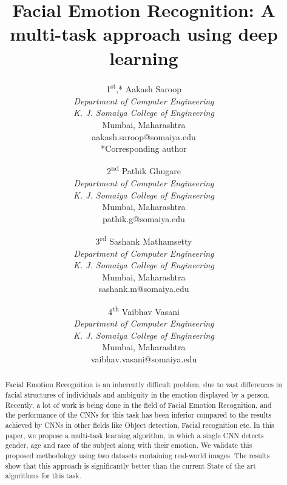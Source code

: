 \documentclass[letterpaper,10pt]{article}
\begin{document}
\title{Facial Emotion Recognition: A multi-task approach using deep learning}

\author{{1\textsuperscript{st},* Aakash Saroop}\\
{\textit{Department of Computer Engineering}} \\
{\textit{K. J. Somaiya College of Engineering}}\\
{Mumbai, Maharashtra}\\
{aakash.saroop@somaiya.edu}\\
{*Corresponding author}\\
\and
{2\textsuperscript{nd} Pathik Ghugare}\\
{\textit{Department of Computer Engineering}}\\
{\textit{K. J. Somaiya College of Engineering}}\\
{Mumbai, Maharashtra} \\
{pathik.g@somaiya.edu}\\
\and
{3\textsuperscript{rd} Sashank Mathamsetty}\\
{\textit{Department of Computer Engineering}}\\
{\textit{K. J. Somaiya College of Engineering}}\\
{Mumbai, Maharashtra} \\
{sashank.m@somaiya.edu }\\
\and
{4\textsuperscript{th} Vaibhav Vasani}\\
{\textit{Department of Computer Engineering}}\\ 
{\textit{K. J. Somaiya College of Engineering}}\\
{Mumbai, Maharashtra} \\
{vaibhav.vasani@somaiya.edu}\\
}

\maketitle

\begin{abstract}
Facial Emotion Recognition is an inherently difficult problem, due to vast differences in facial structures of individuals and ambiguity in the emotion displayed by a person. Recently, a lot of work is being done in the field of Facial Emotion Recognition, and the performance of the CNNs for this task has been inferior compared to the results achieved by CNNs in other fields like Object detection, Facial recognition etc. In this paper, we propose a multi-task learning algorithm, in which a single CNN detects gender, age and race of the subject along with their emotion. We validate this proposed methodology using two datasets containing real-world images. The results show that this approach is significantly better than the current State of the art algorithms for this task.

\end{abstract}
\end{document}
